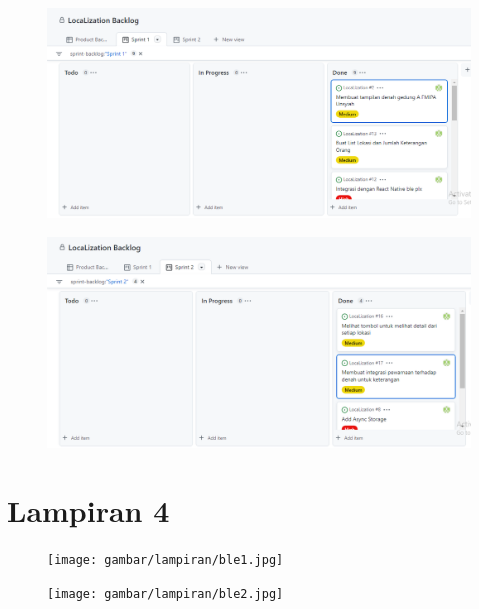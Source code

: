 \begin{figure}[H]
  \center
  \includegraphics [width = 13.5 cm, height= 6.75 cm]{gambar/lampiran/sprint1.PNG}
\end{figure}
\begin{figure}[H]
  \center
  \includegraphics [width = 13.5 cm, height= 6.75 cm]{gambar/lampiran/sprint2.PNG}
\end{figure}


\chapter*{Lampiran 4}
\centering
\vspace{0.4cm}

\begin{figure}[H]
  \center
  \texttt{[image: gambar/lampiran/ble1.jpg]}
\end{figure}
\begin{figure}[H]
  \center
  \texttt{[image: gambar/lampiran/ble2.jpg]}
\end{figure}

